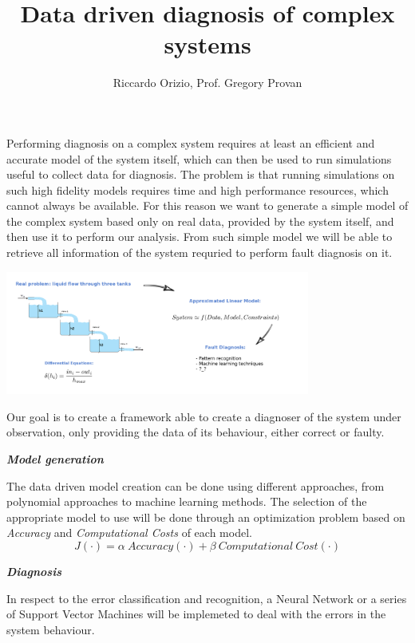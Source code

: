 \documentclass[a0paper]{tikzposter}
\title{Data driven diagnosis of complex systems}
\author{Riccardo Orizio, Prof. Gregory Provan}
\institute{University College Cork}
\begin{document}
	\maketitle[width=0.9\textwidth]

	{
		Performing diagnosis on a complex system requires at least an efficient
		and accurate model of the system itself, which can then be used to
		run simulations useful to collect data for diagnosis.
		The problem is that running simulations on such high fidelity models
		requires time and high performance resources, which cannot always be
		available.
		For this reason we want to generate a simple model of the complex system
		based only on real data, provided by the system itself, and then use it
		to perform our analysis.
		From such simple model we will be able to retrieve all information of
		the system requried to perform fault diagnosis on it.

		\begin{center}
			\includegraphics[width=0.75\textwidth]{./Images/3tanks.png}
		\end{center}
	}

	{
		Our goal is to create a framework able to create a diagnoser of the
		system under observation, only providing the data of its behaviour,
		either correct or faulty. \\
		
		\begin{minipage}[t]{0.43\textwidth}
			\begin{center}
				\textbf{\textit{Model generation}}
			\end{center}
			The data driven model creation can be done using different
			approaches, from polynomial approaches to machine learning methods.
			The selection of the appropriate model to use will be done through
			an optimization problem based on \emph{Accuracy} and
			\emph{Computational Costs} of each model.
			$$ J(\cdot) = \alpha\ Accuracy(\cdot) + \beta\ Computational\ Cost(\cdot) $$
		\end{minipage}
		\hspace{15mm}
		\begin{minipage}[t]{0.43\textwidth}
			\begin{center}
				\textbf{\textit{Diagnosis}}
			\end{center}
			In respect to the error classification and recognition, a Neural
			Network or a series of Support Vector Machines will be implemeted to
			deal with the errors in the system behaviour.
		\end{minipage}
	}
\end{document}
